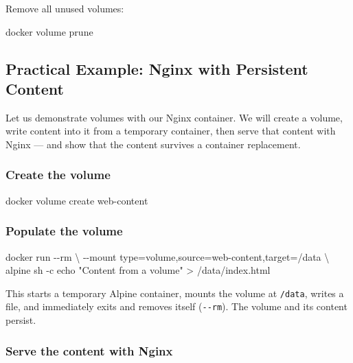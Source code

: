 \documentclass[11pt,american,a4paper,openany]{book}
\newenvironment{Shaded}{}{}
\newcommand{\NormalTok}[1]{#1}
\begin{document}
Remove all unused volumes:

\begin{Shaded}
\begin{Highlighting}[]
\NormalTok{docker volume prune}
\end{Highlighting}
\end{Shaded}

\subsection{Practical Example: Nginx with Persistent
Content}\label{practical-example-nginx-with-persistent-content}

Let us demonstrate volumes with our Nginx container. We will create a
volume, write content into it from a temporary container, then serve
that content with Nginx --- and show that the content survives a
container replacement.

\subsubsection{Create the volume}\label{create-the-volume}

\begin{Shaded}
\begin{Highlighting}[]
\NormalTok{docker volume create web{-}content}
\end{Highlighting}
\end{Shaded}

\subsubsection{Populate the volume}\label{populate-the-volume}

\begin{Shaded}
\begin{Highlighting}[]
\NormalTok{docker run {-}{-}rm \textbackslash{}}
\NormalTok{  {-}{-}mount type=volume,source=web{-}content,target=/data \textbackslash{}}
\NormalTok{  alpine sh {-}c \textquotesingle{}echo "Content from a volume" \textgreater{} /data/index.html\textquotesingle{}}
\end{Highlighting}
\end{Shaded}

This starts a temporary Alpine container, mounts the volume at
\texttt{/data}, writes a file, and immediately exits and removes itself
(\texttt{-\/-rm}). The volume and its content persist.

\subsubsection{Serve the content with
Nginx}\label{serve-the-content-with-nginx}
\end{document}
